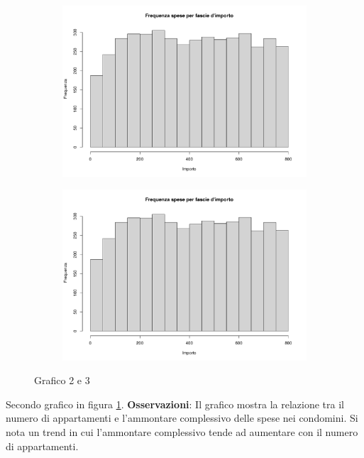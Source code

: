 \begin{figure}[h]
    \centering
    \begin{subfigure}[b]{0.5\textwidth}
        \centering
        \includegraphics[page=2,width=\textwidth]{../R/grafici.pdf}
    \end{subfigure}
    \hfill
    \begin{subfigure}[b]{0.5\textwidth}
        \centering
        \includegraphics[page=3,width=\textwidth]{../R/grafici.pdf}
    \end{subfigure}
    \caption{Grafico 2 e 3}
    \label{fig2}
\end{figure}

Secondo grafico in figura \ref{fig2}. \textbf{Osservazioni}: Il grafico mostra la relazione tra il numero di appartamenti e l'ammontare complessivo delle spese nei condomini. Si nota un trend in cui l'ammontare complessivo tende ad aumentare con il numero di appartamenti.

